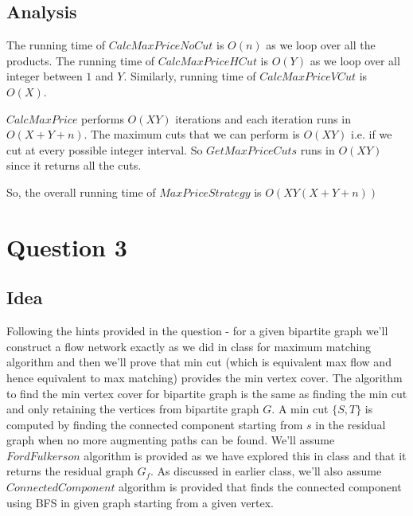 \documentclass{article}
\begin{document}
    \subsection*{Analysis}
    The running time of $CalcMaxPriceNoCut$ is $O(n)$ as we loop over all the products. The running time of $CalcMaxPriceHCut$ is $O(Y)$ as we loop over all integer between $1$ and $Y$. Similarly, running time of $CalcMaxPriceVCut$ is $O(X)$.

    $CalcMaxPrice$ performs $O(XY)$ iterations and each iteration runs in $O(X+Y+n)$. The maximum cuts that we can perform is $O(XY)$ i.e. if we cut at every possible integer interval. So $GetMaxPriceCuts$ runs in $O(XY)$ since it returns all the cuts.
    
    So, the overall running time of $MaxPriceStrategy$ is $O(XY(X+Y+n))$

    \section*{Question 3}

    \subsection*{Idea}
    Following the hints provided in the question - for a given bipartite graph we'll construct a flow network exactly as we did in class for maximum matching algorithm and then we'll prove that min cut (which is equivalent max flow and hence equivalent to max matching) provides the min vertex cover. The algorithm to find the min vertex cover for bipartite graph is the same as finding the min cut and only retaining the vertices from bipartite graph $G$. A min cut $\{S, T\}$ is computed by finding the connected component starting from $s$ in the residual graph when no more augmenting paths can be found. We'll assume $FordFulkerson$ algorithm is provided as we have explored this in class and that it returns the residual graph $G_f$. As discussed in earlier class, we'll also assume $ConnectedComponent$ algorithm is provided that finds the connected component using BFS in given graph starting from a given vertex.
\end{document}
